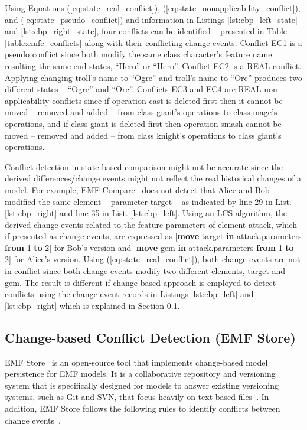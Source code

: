 Using Equations (\ref{eq:state_real_conflict}), (\ref{eq:state_nonapplicability_conflict}), and (\ref{eq:state_pseudo_conflict}) and information in Listings \ref{lst:cbp_left_state} and \ref{lst:cbp_right_state}, four conflicts can be identified -- presented in Table \ref{table:emfc_conflicts} along with their conflicting change events. Conflict \textsf{EC1} is a \textsf{pseudo} conflict since both modify the same class \textsf{character}'s feature \textsf{name} resulting the same end states, ``Hero'' or ``Hero''. Conflict \textsf{EC2} is a \textsf{REAL} conflict. Applying changing \textsf{troll}'s \textsf{name} to ``Ogre'' and \textsf{troll}'s \textsf{name} to ``Orc'' produces two different states -- ``Ogre'' and ``Orc''. Conflicts \textsf{EC3} and \textsf{EC4} are \textsf{REAL} non-applicability conflicts since if operation \textsf{cast} is deleted first then it cannot be moved -- removed and added -- from class \textsf{giant}'s \textsf{operations} to class \textsf{mage}'s \textsf{operations}, and if class \textsf{giant} is deleted first then operation \textsf{smash} cannot be moved -- removed and added -- from  class \textsf{knight}'s \textsf{operations} to class \textsf{giant}'s \textsf{operations}.

Conflict detection in state-based comparison might not be accurate since the derived differences/change events might not reflect the real historical changes of a model. For example, EMF Compare~\cite{emfcompare2018developer} does not detect that Alice and Bob modified the same element -- parameter \textsf{target} -- as indicated by line 29 in List. \ref{lst:cbp_right} and line 35 in List. \ref{lst:cbp_left}. Using an LCS algorithm, the derived change events related to the feature \textsf{parameters} of element \textsf{attack}, which if presented as change events, are expressed as [\textsf{\small \textbf{move} target \textbf{in} attack.parameters \textbf{from} 1 \textbf{to} 2}] for Bob's version and [\textsf{\small \textbf{move} gem \textbf{in} attack.parameters \textbf{from} 1 \textbf{to} 2}] for Alice's version. Using (\ref{eq:state_real_conflict}), both change events are not in conflict since both change events modify two different elements, \textsf{target} and \textsf{gem}. The result is different if change-based approach is employed to detect conflicts using the change event records in Listings \ref{lst:cbp_left} and \ref{lst:cbp_right} which is explained in Section \ref{sec:emfstore_conflict_detection}.

\subsection{Change-based Conflict Detection (EMF Store)}
\label{sec:emfstore_conflict_detection}
EMF Store~\cite{koegel2010emfstore} is an open-source tool that implements change-based model persistence for EMF models. It is a collaborative repository and versioning system that is specifically designed for models to answer existing versioning systems, such as Git and SVN, that focus heavily on text-based files~\cite{emfstore2019what}. In addition, EMF Store follows the following rules to identify conflicts between change events~\cite{koegel2010operation}. 

